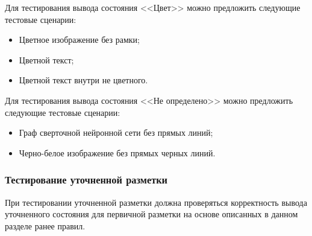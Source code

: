 Для тестирования вывода состояния <<Цвет>> можно предложить следующие тестовые сценарии:
\begin{itemize}
    \item Цветное изображение без рамки;
    \item Цветной текст;
    \item Цветной текст внутри не цветного.
\end{itemize}

Для тестирования вывода состояния <<Не определено>> можно предложить следующие тестовые сценарии:
\begin{itemize}
    \item Граф сверточной нейронной сети без прямых линий;
    \item Черно-белое изображение без прямых черных линий.
\end{itemize}

\subsubsection{Тестирование уточненной разметки}

При тестировании уточненной разметки должна проверяться корректность вывода уточненного состояния для первичной разметки на основе описанных в данном разделе ранее правил.


